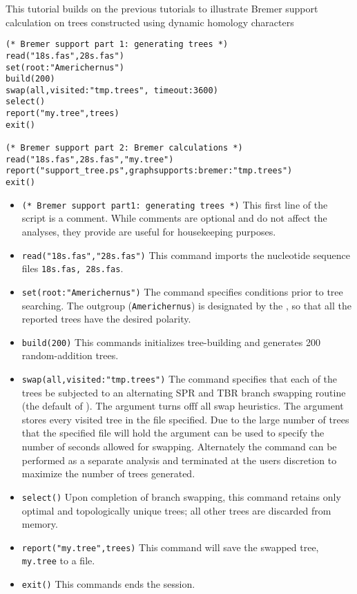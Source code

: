 This tutorial builds on the previous tutorials to illustrate Bremer support 
calculation on trees constructed using dynamic homology characters
    
   \begin{verbatim}
(* Bremer support part 1: generating trees *)
read("18s.fas",28s.fas")
set(root:"Americhernus")
build(200)
swap(all,visited:"tmp.trees", timeout:3600)
select()
report("my.tree",trees)
exit()

(* Bremer support part 2: Bremer calculations *)
read("18s.fas",28s.fas","my.tree")
report("support_tree.ps",graphsupports:bremer:"tmp.trees")
exit()
\end{verbatim}

\begin{itemize}
\item \texttt{(* Bremer support part1: generating trees *)} This first line of the script is a comment. While comments are optional and do not affect the analyses, they provide are useful for housekeeping purposes. 
\item \texttt{read("18s.fas","28s.fas")} This command imports the nucleotide sequence files \texttt{18s.fas, 28s.fas}.
\item \texttt{set(root:"Americhernus")} The  command specifies conditions prior to tree searching. The outgroup (\texttt{Americhernus}) is designated by the , so that all the reported trees have the desired polarity.     
\item \texttt{build(200)} This commands initializes tree-building and generates 200 random-addition trees.      
\item \texttt{swap(all,visited:"tmp.trees")} The  command specifies that each of the trees be subjected to an alternating SPR and TBR branch swapping routine (the default of \poy).  The  argument turns offf all swap heuristics. The  argument stores every visited tree in the file specified.  Due to the large number of trees that the specified file will hold the argument  can be used to specify the number of seconds allowed for swapping.  Alternately  the   command can be performed as a separate analysis and terminated at the users discretion to maximize the number of trees generated.
\item \texttt{select()} Upon completion of branch swapping, this command retains only optimal and topologically unique trees; all other trees are discarded from memory. 
\item \texttt{report("my.tree",trees)} This command will save the swapped tree, \\ \texttt{my.tree} to a file. 
\item \texttt{exit()} This commands ends the \poy session.


\end{itemize}
